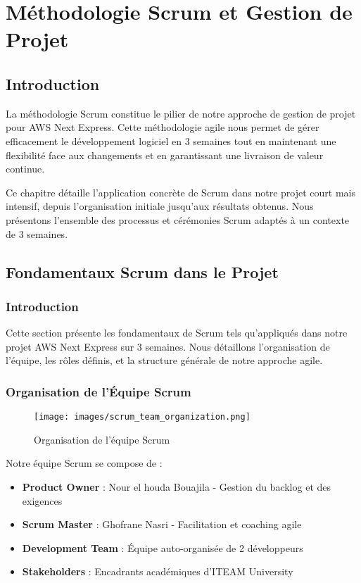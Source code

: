 \chapter{Méthodologie Scrum et Gestion de Projet}

\section{Introduction}

La méthodologie Scrum constitue le pilier de notre approche de gestion de projet pour AWS Next Express. Cette méthodologie agile nous permet de gérer efficacement le développement logiciel en 3 semaines tout en maintenant une flexibilité face aux changements et en garantissant une livraison de valeur continue.

Ce chapitre détaille l'application concrète de Scrum dans notre projet court mais intensif, depuis l'organisation initiale jusqu'aux résultats obtenus. Nous présentons l'ensemble des processus et cérémonies Scrum adaptés à un contexte de 3 semaines.

\section{Fondamentaux Scrum dans le Projet}

\subsection{Introduction}

Cette section présente les fondamentaux de Scrum tels qu'appliqués dans notre projet AWS Next Express sur 3 semaines. Nous détaillons l'organisation de l'équipe, les rôles définis, et la structure générale de notre approche agile.

\subsection{Organisation de l'Équipe Scrum}

\begin{figure}[H]
    \centering
    \texttt{[image: images/scrum\_team\_organization.png]}
    \caption{Organisation de l'équipe Scrum}
    \label{fig:scrum_team}
\end{figure}

Notre équipe Scrum se compose de :

\begin{itemize}
    \item \textbf{Product Owner} : Nour el houda Bouajila - Gestion du backlog et des exigences
    \item \textbf{Scrum Master} : Ghofrane Nasri - Facilitation et coaching agile
    \item \textbf{Development Team} : Équipe auto-organisée de 2 développeurs
    \item \textbf{Stakeholders} : Encadrants académiques d'ITEAM University
\end{itemize}

